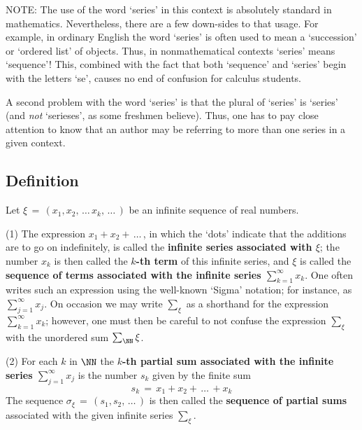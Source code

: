        NOTE: The use of the word `series' in this context is absolutely standard in mathematics.
    Nevertheless, there are a few down-sides to that usage. For example, in ordinary English the word `series' is often used to mean a `succession' or `ordered list' of objects.
    Thus, in nonmathematical contexts `series' means `sequence'! This, combined with the fact that both `sequence' and `series' begin with the letters `se', causes no end of confusion for calculus students.

        A second problem with the word `series' is that the plural of `series' is `series' (and {\em not} `serieses', as some freshmen believe).
    Thus, one has to pay close attention to know that an author may be referring to more than one series in a given context.

\V

        \subsection{\small{{\bf Definition}}}
        \label{DefG30.20}

        Let ${\xi} \,=\, (x_{1},x_{2},\,{\ldots}\,x_{k},\,{\ldots}\,)$ be an infinite sequence of real numbers.

\V

        (1) The expression $x_{1}+x_{2}+\,{\ldots}\,$, in which the `dots' indicate that the additions are to go on indefinitely,
    is called the {\bf infinite series associated with ${\xi}$}; the number $x_{k}$ is then called the {\bf $k$-th term} of this infinite series, and ${\xi}$ is called the {\bf sequence of terms associated with the infinite series $\sum_{k=1}^{{\infty}} x_{k}$}.
    One often writes such an expression using the well-known `Sigma' notation; for instance, as $\sum_{j=1}^{{\infty}} x_{j}$.
    On occasion we may write $\sum_{{\xi}}$ as a shorthand for the expression $\sum_{k=1}^{{\infty}} x_{k}$;
    however, one must then be careful to not confuse the expression $\sum_{{\xi}}$ with the unordered sum $\sum_{{\NN}} {\xi}$.

\V

        (2) For each $k$ in ${\NN}$ the {\bf $k$-th partial sum associated with the infinite series $\sum_{j=1}^{{\infty}} x_{j}$} is the number $s_{k}$ given by the finite sum
        \begin{displaymath}
        s_{k} \,=\, x_{1} + x_{2} + \,{\ldots}\, + x_{k}
        \end{displaymath}
    The sequence ${\sigma}_{{\xi}} \,=\, (s_{1},s_{2},\,{\ldots}\,)$ is then called the {\bf sequence of partial sums} associated with the given infinite series $\sum_{{\xi}}$.

